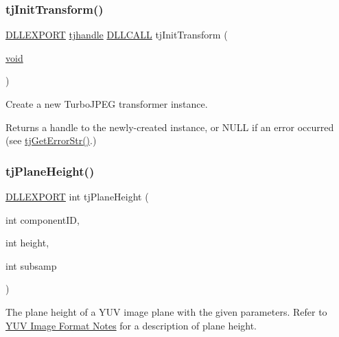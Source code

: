 \subsubsection{\texorpdfstring{tj\+Init\+Transform()}{tjInitTransform()}}
{\footnotesize\ttfamily \hyperlink{turbojpeg_8h_a808e08638be3cba36e36759e5b150de0}{D\+L\+L\+E\+X\+P\+O\+RT} \hyperlink{group___turbo_j_p_e_g_ga758d2634ecb4949de7815cba621f5763}{tjhandle} \hyperlink{turbojpeg_8h_a54b25836118bfac94a53a7b790f3ccb2}{D\+L\+L\+C\+A\+LL} tj\+Init\+Transform (\begin{DoxyParamCaption}\item[{\hyperlink{png_8h_ac9c84fa68bbad002983e35ce3663c686}{void}}]{ }\end{DoxyParamCaption})}

Create a new Turbo\+J\+P\+EG transformer instance.

\begin{DoxyReturn}{Returns}
a handle to the newly-\/created instance, or N\+U\+LL if an error occurred (see \hyperlink{group___turbo_j_p_e_g_ga9af79c908ec131b1ae8d52fe40375abf}{tj\+Get\+Error\+Str()}.) 
\end{DoxyReturn}
\mbox{\label{group___turbo_j_p_e_g_ga1a209696c6a80748f20e134b3c64789f}} 
\subsubsection{\texorpdfstring{tj\+Plane\+Height()}{tjPlaneHeight()}}
{\footnotesize\ttfamily \hyperlink{turbojpeg_8h_a808e08638be3cba36e36759e5b150de0}{D\+L\+L\+E\+X\+P\+O\+RT} int tj\+Plane\+Height (\begin{DoxyParamCaption}\item[{int}]{component\+ID,  }\item[{int}]{height,  }\item[{int}]{subsamp }\end{DoxyParamCaption})}

The plane height of a Y\+UV image plane with the given parameters. Refer to \hyperlink{group___turbo_j_p_e_g_YUVnotes}{Y\+UV Image Format Notes} for a description of plane height.


